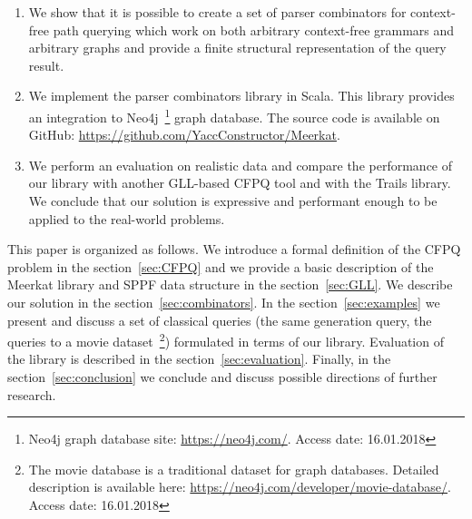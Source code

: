 \begin{enumerate}
\item We show that it is possible to create a set of parser combinators for context-free path querying which work on both arbitrary context-free grammars and arbitrary graphs and provide a finite structural representation of the query result.
\item We implement the parser combinators library in Scala. This library provides an integration to Neo4j~\footnote{Neo4j graph database site: \url{https://neo4j.com/}. Access date: 16.01.2018} graph database. The source code is available on GitHub: \url{https://github.com/YaccConstructor/Meerkat}.
\item We perform an evaluation on realistic data and compare the performance of our library with another GLL-based CFPQ tool and with the Trails library.
We conclude that our solution is expressive and performant enough to be applied to the real-world problems.
\end{enumerate}


This paper is organized as follows.
We introduce a formal definition of the CFPQ problem in the section~\ref{sec:CFPQ} and we provide a basic description of the Meerkat library and SPPF data structure in the section~\ref{sec:GLL}.
We describe our solution in the section~\ref{sec:combinators}.
In the section~\ref{sec:examples} we present and discuss a set of classical queries (the same generation query, the queries to a movie dataset~\footnote{The movie database is a traditional dataset for graph databases. Detailed description is available here: \url{https://neo4j.com/developer/movie-database/}. Access date: 16.01.2018}) 
formulated in terms of our library.
Evaluation of the library is described in the section~\ref{sec:evaluation}.
Finally, in the section~\ref{sec:conclusion} we conclude and discuss possible directions of further research.
